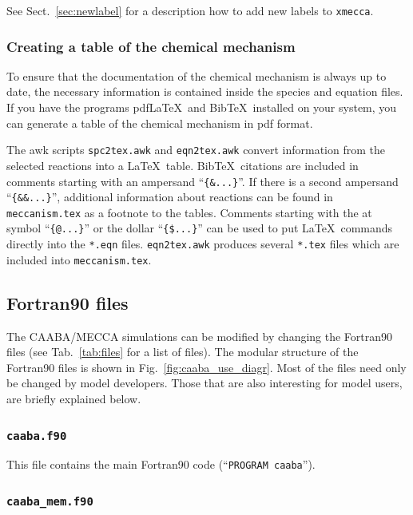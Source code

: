 \documentclass[twoside]{article}
\begin{document}
See Sect.~\ref{sec:newlabel} for a description how to add new labels to
\verb|xmecca|.

\subsubsection{Creating a table of the chemical mechanism}
\label{sec:latextable}

To ensure that the documentation of the chemical mechanism is always up
to date, the necessary information is contained inside the species and
equation files. If you have the programs pdfLa\TeX\ and Bib\TeX\
installed on your system, you can generate a table of the chemical
mechanism in pdf format.

The awk scripts \verb|spc2tex.awk| and \verb|eqn2tex.awk| convert
information from the selected reactions into a La\TeX\ table. Bib\TeX\
citations are included in comments starting with an ampersand
``\verb|{&...}|''. If there is a second ampersand ``\verb|{&&...}|'',
additional information about reactions can be found in
\verb|meccanism.tex| as a footnote to the tables. Comments starting with
the at symbol ``\verb|{@...}|'' or the dollar ``\verb|{$...}|'' can be
used to put La\TeX\ commands directly into the \verb|*.eqn| files.
\verb|eqn2tex.awk| produces several \verb|*.tex| files which are
included into \verb|meccanism.tex|.

\subsection{Fortran90 files}
\label{sec:f90files}

The CAABA/MECCA simulations can be modified by changing the Fortran90
files (see Tab.~\ref{tab:files} for a list of files). The modular
structure of the Fortran90 files is shown in
Fig.~\ref{fig:caaba_use_diagr}. Most of the files need only be changed
by model developers. Those that are also interesting for model users,
are briefly explained below.

\subsubsection{{\tt caaba.f90}}

This file contains the main Fortran90 code (``\verb|PROGRAM caaba|'').

\subsubsection{{\tt caaba\_mem.f90}}
\end{document}
